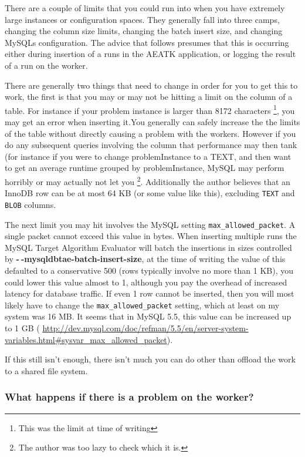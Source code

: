 \documentclass[11pt,letterpaper,oneside]{article}
\begin{document}
There are a couple of limits that you could run into when you have extremely large instances or configuration spaces. They generally fall into three camps, changing the column size limits, changing the batch insert size, and changing MySQLs configuration. The advice that follows presumes that this is occurring either during insertion of a runs in the AEATK application, or logging the result of a run on the worker.

There are generally two things that need to change in order for you to get this to work, the first is that you may or may not be hitting a limit on the column of a table. For instance if your problem instance is larger than 8172 characters \footnote{This was the limit at time of writing}, you may get an error when inserting it.You generally can safely increase the the limits of the table without directly causing a problem with the workers. However if you do any subsequent queries involving the column that performance may then tank (for instance if you were to change problemInstance to a TEXT, and then want to get an average runtime grouped by problemInstance, MySQL may perform horribly or may actually not let you \footnote{The author was too lazy to check which it is.}. Additionally the author believes that an InnoDB row can be at most 64 KB (or some value like this), excluding \texttt{TEXT} and \texttt{BLOB} columns. 

The next limit you may hit involves the MySQL setting \texttt{max\_allowed\_packet}. A single packet cannot exceed this value in bytes. When inserting multiple runs the MySQL Target Algorithm Evaluator will batch the insertions in sizes controlled by \textbf{-$~\!$-mysqldbtae-batch-insert-size}, at the time of writing the value of this defaulted to a conservative 500 (rows typically involve no more than 1 KB), you could lower this value almost to 1, although you pay the overhead of increased latency for database traffic.  If even 1 row cannot be inserted, then you will most likely have to change the \texttt{max\_allowed\_packet} setting, which at least on my system was 16 MB. It seems that in MySQL 5.5, this value can be increased up to 1 GB ( \url{http://dev.mysql.com/doc/refman/5.5/en/server-system-variables.html#sysvar\_max\_allowed\_packet}).

If this still isn't enough, there isn't much you can do other than offload the work to a shared file system.

\subsubsection{What happens if there is a problem on the worker?}
\end{document}
